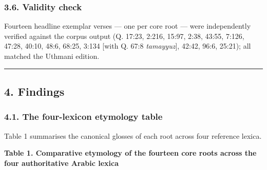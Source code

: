 \documentclass[11pt,a4paper]{article}
\begin{document}
\subsubsection{3.6. Validity check}\label{validity-check}

Fourteen headline exemplar verses --- one per core root --- were
independently verified against the corpus output (Q. 17:23, 2:216,
15:97, 2:38, 43:55, 7:126, 47:28, 40:10, 48:6, 68:25, 3:134 {[}with Q.
67:8 \emph{tamayyuz}{]}, 42:42, 96:6, 25:21); all matched the Uthmani
edition.

\begin{center}\rule{0.5\linewidth}{0.5pt}\end{center}

\subsection{4. Findings}\label{findings}

\subsubsection{4.1. The four-lexicon etymology
table}\label{the-four-lexicon-etymology-table}

Table 1 summarises the canonical glosses of each root across four
reference lexica.

\textbf{Table 1. Comparative etymology of the fourteen core roots across
the four authoritative Arabic lexica}
\end{document}
